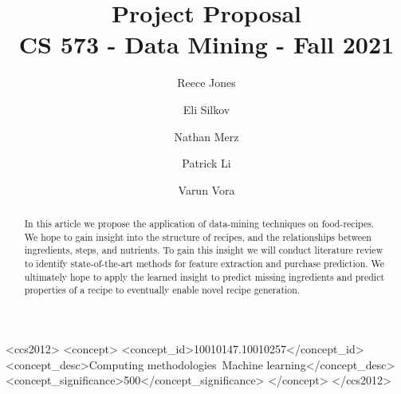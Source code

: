 \documentclass[sigconf]{acmart}
\begin{document}
\title{%
  Project Proposal \\
  \large CS 573 - Data Mining - Fall 2021}

\author{Reece Jones}

\author{Eli Silkov}

\author{Nathan Merz}

\author{Patrick Li}

\author{Varun Vora}

\renewcommand{\shortauthors}{Jones, Silkov, Merz, Li, Vora}

\begin{abstract}
  In this article we propose the application of data-mining techniques on
  food-recipes. We hope to gain insight into the structure of recipes, and the relationships between ingredients, steps, and nutrients. To gain this insight we will conduct literature review to identify state-of-the-art methods for feature extraction and purchase prediction. We ultimately hope to apply the learned insight to predict missing ingredients and predict properties of a recipe to eventually enable  novel recipe generation.
\end{abstract}

\begin{CCSXML}
<ccs2012>
   <concept>
       <concept_id>10010147.10010257</concept_id>
       <concept_desc>Computing methodologies~Machine learning</concept_desc>
       <concept_significance>500</concept_significance>
       </concept>
 </ccs2012>
\end{CCSXML}
\end{document}
